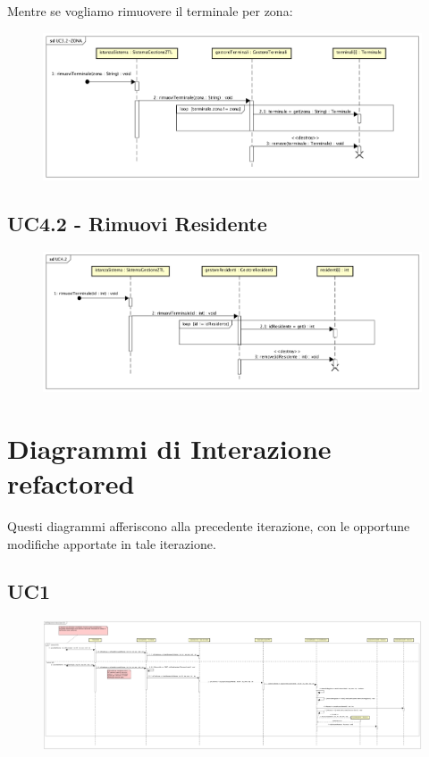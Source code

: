 \documentclass[12pt, letterpaper]{article}
\begin{document}
\noindent
Mentre se vogliamo rimuovere il terminale
per zona:
\begin{figure}[H]
    \centering
    \includegraphics[scale=0.30]{UC3.2-DI-ZONA}
    \label{fig:mesh1}
\end{figure}

\subsection{UC4.2 - Rimuovi Residente}
\begin{figure}[H]
    \centering
    \includegraphics[scale=0.30]{UC4.2-DI}
    \label{fig:mesh1}
\end{figure}

\section{Diagrammi di Interazione refactored}
Questi diagrammi afferiscono alla precedente
iterazione, con le opportune modifiche apportate 
in tale iterazione.
\subsection{UC1}
\begin{figure}[H]
    \centering
    \includegraphics[scale=0.10]{UC1-DI}
    \label{fig:mesh1}
\end{figure}
\end{document}
